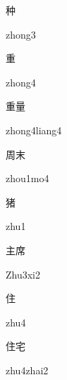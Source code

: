 \begin{multicols*}{2}
\begin{verbete}[zhong3]{种}
\begin{pronuncia}{zhong3}
\end{pronuncia}
\end{verbete}

\begin{verbete}[zhong4]{重}
\begin{pronuncia}{zhong4}
\end{pronuncia}
\end{verbete}

\begin{verbete}{重量}
\begin{pronuncia}{zhong4liang4}
\end{pronuncia}
\end{verbete}

\begin{verbete}[zhou1mo4]{周末}
\begin{pronuncia}{zhou1mo4}
\end{pronuncia}
\end{verbete}

\begin{verbete}[zhu1]{猪}
\begin{pronuncia}{zhu1}
\end{pronuncia}
\end{verbete}

\begin{verbete}[Zhu3xi2]{主席}
\begin{pronuncia}{Zhu3xi2}
\end{pronuncia}
\end{verbete}

\begin{verbete}[zhu4]{住}
\begin{pronuncia}{zhu4}
\end{pronuncia}
\end{verbete}

\begin{verbete}{住宅}
\begin{pronuncia}{zhu4zhai2}
\end{pronuncia}
\end{verbete}


\end{multicols*}
